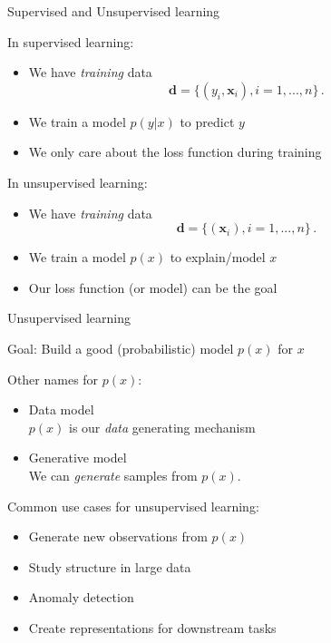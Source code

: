 \documentclass[10pt]{beamer}
\begin{document}
\begin{frame}{Supervised and Unsupervised learning}

In {\color{uured} supervised} learning:
\begin{itemize}
\item We have \emph{training} data
\[
\mathbf{d} = \{(y_i, \mathbf{x}_i), i = 1, ..., n\} \,.
\]
\item We train a model $p(y|x)$ to {\color{uured} predict} $y$
\item We only care about the loss function during training
\end{itemize}
\pause
In {\color{uured} unsupervised}  learning:
\begin{itemize}
\item We have \emph{training} data
\[
\mathbf{d} = \{(\mathbf{x}_i), i = 1, ..., n\} \,.
\]
\item We train a model $p(x)$ to {\color{uured} explain/model} $x$
\item Our loss function (or model) can be the goal
\end{itemize}
\end{frame}


\begin{frame}{Unsupervised learning}

{\color{uured} Goal}: Build a good (probabilistic) model $p(x)$ for $x$

\pause

Other names for $p(x)$:
\begin{itemize}
\item {\color{uured} Data} model\\ $p(x)$ is our \emph{data} generating mechanism
\item {\color{uured} Generative} model\\ We can \emph{generate} samples from $p(x)$. 
\end{itemize}
\pause
Common use cases for unsupervised learning:
\begin{itemize}
\item Generate new observations from $p(x)$ %
\item Study structure in large data %
\item Anomaly detection %
\item Create representations for downstream tasks %
\end{itemize}

\end{frame}
\end{document}
